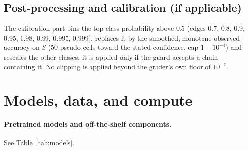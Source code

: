 \documentclass{article}
\begin{document}
\subsection{Post-processing and calibration (if applicable)}
The calibration part bins the top-class probability above 0.5 (edges 0.7, 0.8, 0.9, 0.95,
0.98, 0.99, 0.995, 0.999), replaces it by the smoothed, monotone observed accuracy on $S$
(50 pseudo-cells toward the stated confidence, cap $1-10^{-4}$) and rescales the other
classes; it is applied only if the guard accepts a chain containing it. No clipping is
applied beyond the grader's own floor of $10^{-3}$.

\section{Models, data, and compute}
\label{sec:resources}

\paragraph{Pretrained models and off-the-shelf components.} See Table~\ref{tab:models}.

\begin{table}[h]
  \centering
  \small
  \caption{Pretrained models and off-the-shelf components.}
  \label{tab:models}
\end{table}
\end{document}
